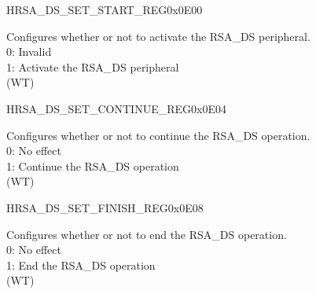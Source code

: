 \begin{register}{H}{RSA\_DS\_SET\_START\_REG}{0x0E00}\label{regdesc:RSADSSETSTARTREG}
%
%
\regnewline%
\begin{regdesc}\begin{reglist}
\label{fielddesc:RSADSSETSTART}\item [RSA\_DS\_SET\_START] Configures whether or not to activate the RSA\_DS peripheral.\\
0: Invalid\\
1: Activate the RSA\_DS peripheral\\ (WT)
\end{reglist}\end{regdesc}
\end{register}


\begin{register}{H}{RSA\_DS\_SET\_CONTINUE\_REG}{0x0E04}\label{regdesc:RSADSSETCONTINUEREG}
%
%
\regnewline%
\begin{regdesc}\begin{reglist}
\label{fielddesc:RSADSSETCONTINUE}\item [RSA\_DS\_SET\_CONTINUE] Configures whether or not to continue the RSA\_DS operation. \\
0: No effect\\
1: Continue the RSA\_DS operation\\
(WT)
\end{reglist}\end{regdesc}
\end{register}


\begin{register}{H}{RSA\_DS\_SET\_FINISH\_REG}{0x0E08}\label{regdesc:RSADSSETFINISHREG}
%
%
\regnewline%
\begin{regdesc}\begin{reglist}
\label{fielddesc:RSADSSETFINISH}\item [RSA\_DS\_SET\_FINISH] Configures whether or not to end the RSA\_DS operation. \\
0: No effect\\
1: End the RSA\_DS operation\\
(WT)
\end{reglist}\end{regdesc}
\end{register}


